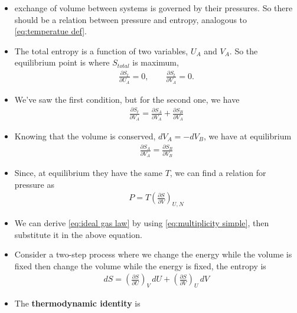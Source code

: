 \documentclass{book}
\begin{document}
\begin{itemize}
	\item exchange of volume between systems is governed by their pressures. So there should be a relation
	      between pressure and entropy, analogous to \eqref{eq:temperatue def}.
	\item The total entropy is a function of two variables, $ U_A $  and $ V_A $. So the equilibrium point
	      is where $ S_{total} $ is maximum,
	      \begin{align}
		      \frac{\partial  S_{t}}{\partial U_A} =0, \qquad \frac{\partial S_{t}}{\partial V_A} = 0.
	      \end{align}

	\item We've saw the first condition, but for the second one, we have
	      \begin{align}
		      \frac{\partial S_{t}}{\partial V_A} =
		      \frac{\partial S_{A}}{\partial V_{A}} + \frac{\partial S_{B}}{\partial V_{A}}
	      \end{align}
	\item Knowing that the volume is conserved, $ dV_{A}  = -dV_{B}$, we have at equilibrium
	      \begin{align}
		      \frac{\partial S_{A}}{\partial V_{A}} = \frac{\partial S_{B}}{\partial V_{B}}
	      \end{align}
	\item Since, at equilibrium they have the same $T$, we can find a relation for pressure as
	      \begin{align}
		      \label{eq:pressure with entropy}
		      P = T \left( \frac{\partial S}{\partial V} \right)_{U, N}
	      \end{align}
	\item We can derive \eqref{eq:ideal gas law} by using \eqref{eq:multiplicity simple}, then substitute it in the
	      above equation.
	\item Consider a two-step process where we change the energy while the volume is fixed then
	      change the volume while the energy is fixed, the entropy is
	      \begin{align}
		      \label{eq:two-step process entropy}
		      dS = \left( \frac{\partial S}{\partial U} \right)_{V} \, dU
		      + \left( \frac{\partial S}{\partial V} \right)_{U}\, dV
	      \end{align}
	\item The \textbf{thermodynamic identity} is
	      \begin{align}
		      \label{eq:thermo identity}

\end{align}
\end{itemize}
\end{document}
